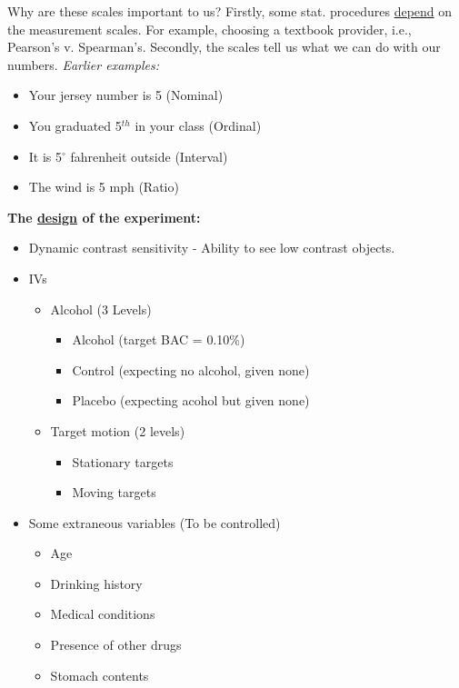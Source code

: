 \documentclass[11pt]{report}
\begin{document}
\noindent Why are these scales important to us? Firstly, some stat. procedures \underline{depend} on the measurement scales. For example, choosing a
textbook provider, i.e., Pearson's v. Spearman's. Secondly, the scales tell us what we can do with our numbers. 
\textit{Earlier examples:}
\begin{itemize}
    \item Your jersey number is 5 (Nominal)
    \item You graduated 5$^{th}$ in your class (Ordinal)
    \item It is 5$^{\circ}$ fahrenheit outside (Interval)
    \item The wind is 5 mph (Ratio)
\end{itemize}
\newpage
{}
{
    \textbf{The \underline{design} of the experiment:}
    \begin{itemize}
        \item Dynamic contrast sensitivity - Ability to see low contrast objects.
        \item IVs 
        \begin{itemize}
            \item Alcohol (3 Levels) 
            \begin{itemize}
                \item Alcohol (target BAC = 0.10\%)
                \item Control (expecting no alcohol, given none)
                \item Placebo (expecting acohol but given none)
            \end{itemize}
            \item Target motion (2 levels) 
            \begin{itemize}
                \item Stationary targets
                \item Moving targets
            \end{itemize}
        \end{itemize}
        \item Some extraneous variables (To be controlled)
        \begin{itemize}
            \item Age 
            \item Drinking history
            \item Medical conditions
            \item Presence of other drugs
            \item Stomach contents 

\end{itemize}
\end{itemize}}
\end{document}
